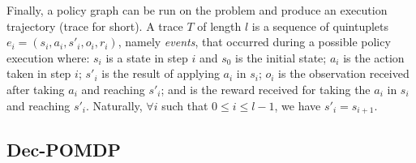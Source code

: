 \documentclass[letterpaper]{article} %
\begin{document}
Finally, a policy graph can be run on the problem and produce an execution trajectory (trace for short). A trace $T$ of length $l$ is a sequence of quintuplets $e_i = (s_i, a_i, s'_i, o_i, r_i)$, namely \emph{events}, that occurred during a possible policy execution where: $s_i$ is a state in step $i$ and $s_0$ is the initial state;
$a_i$ is the action taken in step $i$;
    $s'_i$ is the result of applying $a_i$ in $s_i$;
    $o_i$ is the observation received after taking $a_i$ and reaching $s'_i$; and is the reward received for taking the $a_i$ in $s_i$ and reaching $s'_i$. Naturally, $\forall i$ such
    that $0\leq i \leq l-1$, we have $s'_i=s_{i+1}$.

\subsection{Dec-POMDP}
\end{document}
